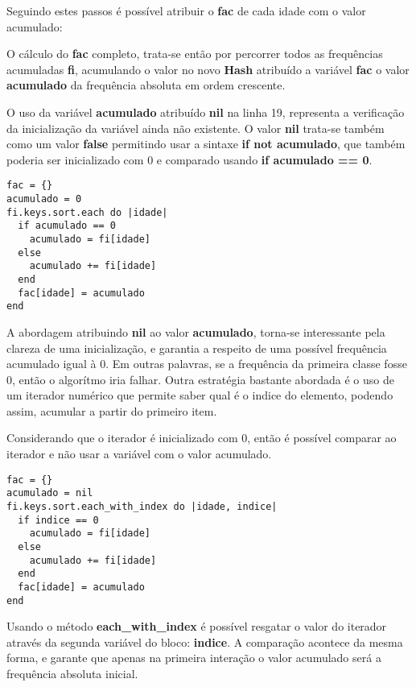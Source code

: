 \documentclass[12pt]{article}
\newcommand{\code}[1] {\textbf{#1}}
\begin{document}
Seguindo estes passos é possível atribuir o \code{fac} de cada idade com o valor acumulado:

 

O cálculo do \code{fac} completo, trata-se então por percorrer todos as frequências acumuladas \code{fi}, acumulando o valor no novo \code{Hash} atribuído a variável \code{fac} o valor \code{acumulado} da frequência absoluta em ordem crescente.

 

O uso da variável \code{acumulado} atribuído \code{nil} na linha 19, representa a verificação da inicialização da variável ainda não existente. O valor \code{nil} trata-se também como um valor \code{false} permitindo usar a sintaxe \code{if not acumulado}, que também poderia ser inicializado com 0 e comparado usando \code{if acumulado == 0}.

\begin{lstlisting}[caption=Usando acumulado com valor inicial 0]
fac = {}
acumulado = 0 
fi.keys.sort.each do |idade|
  if acumulado == 0
    acumulado = fi[idade]
  else
    acumulado += fi[idade]
  end
  fac[idade] = acumulado
end
\end{lstlisting}

A abordagem atribuindo \code{nil} ao valor \code{acumulado}, torna-se interessante pela clareza de uma inicialização, e garantia a respeito de uma possível frequência acumulado igual à 0. Em outras palavras, se a frequência da primeira classe fosse 0, então o algorítmo iria falhar. Outra estratégia bastante abordada é o uso de um iterador numérico que permite saber qual é o indice do elemento, podendo assim, acumular a partir do primeiro item.

Considerando que o iterador é inicializado com 0, então é possível comparar ao iterador e não usar a variável com o valor acumulado.


\begin{lstlisting}[caption=Usando acumulado através do iterador \code{indice}, label=usa indice]
fac = {}
acumulado = nil
fi.keys.sort.each_with_index do |idade, indice|
  if indice == 0
    acumulado = fi[idade]
  else
    acumulado += fi[idade]
  end
  fac[idade] = acumulado
end
\end{lstlisting}

Usando o método \code{each\_with\_index} é possível resgatar o valor do iterador através da segunda variável do bloco: \code{indice}. A comparação acontece da mesma forma, e garante que apenas na primeira interação o valor acumulado será a frequência absoluta inicial.
\end{document}
